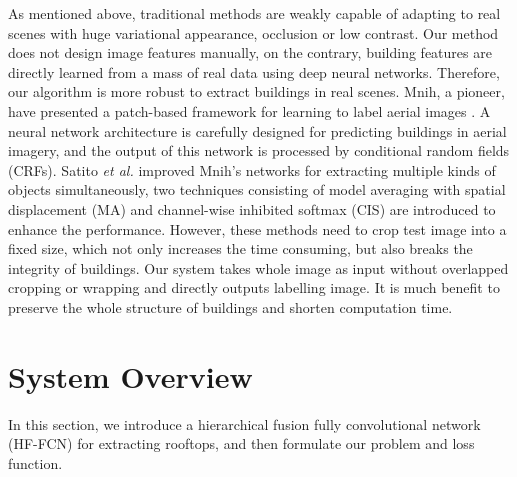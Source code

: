 \documentclass[runningheads]{llncs}
\begin{document}
    As mentioned above, traditional methods are weakly capable of adapting to real scenes with huge variational appearance, occlusion or low contrast. Our method does not design image features manually, on the contrary, building features are directly learned from a mass of real data 
using deep neural networks. Therefore, our algorithm is more robust to  extract buildings in real scenes.  Mnih, a pioneer, have presented a patch-based framework for learning to label aerial images \cite{Mnih2013Machine}. A  neural network architecture is carefully designed for predicting buildings in aerial imagery, and the output of this network is processed by conditional random fields (CRFs). Satito \textit{et al.} \cite{Saito2016Multiple} improved Mnih's networks for extracting multiple kinds of objects simultaneously, two techniques consisting of model averaging with spatial displacement (MA) and channel-wise inhibited softmax (CIS) are introduced to enhance the  performance. However, these methods need to crop test image into a fixed size, which not only increases the time consuming, but also breaks the integrity of buildings. Our system takes whole image as input without overlapped cropping or wrapping and directly outputs labelling image. It is much benefit to preserve the whole structure of buildings and shorten computation time.


   
\section{System Overview} 
\label{section:systemoverview}
   In this section, we introduce a hierarchical fusion fully convolutional network (HF-FCN) for extracting rooftops, and then formulate our problem and loss function.
         
\end{document}
